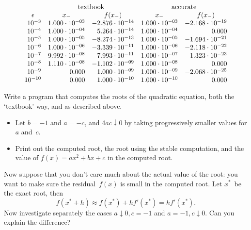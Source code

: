\begin{equation}
  \begin{array}{rrrrr}
    &\multicolumn{2}{c}{\mathrm{textbook}}&\multicolumn{2}{c}{\mathrm{accurate}}\\
    \multicolumn{1}{c}{\epsilon} &\multicolumn{1}{c}{x_-} &\multicolumn{1}{c}{f(x_-)} &\multicolumn{1}{c}{x_-} &\multicolumn{1}{c}{f(x_-)}\\
    10^{-3}& 1.000\cdot 10^{-03}& -2.876\cdot 10^{-14}&  1.000\cdot 10^{-03}&  -2.168\cdot 10^{-19}\\
    10^{-4}& 1.000\cdot 10^{-04}&  5.264\cdot 10^{-14}&  1.000\cdot 10^{-04}&   0.000\\
    10^{-5}& 1.000\cdot 10^{-05}& -8.274\cdot 10^{-13}&  1.000\cdot 10^{-05}&  -1.694\cdot 10^{-21}\\
    10^{-6}& 1.000\cdot 10^{-06}& -3.339\cdot 10^{-11}&  1.000\cdot 10^{-06}&  -2.118\cdot 10^{-22}\\
    10^{-7}& 9.992\cdot 10^{-08}&  7.993\cdot 10^{-11}&  1.000\cdot 10^{-07}&   1.323\cdot 10^{-23}\\
    10^{-8}&  1.110\cdot 10^{-08}& -1.102\cdot 10^{-09}&  1.000\cdot 10^{-08}&   0.000\\
    10^{-9}&  0.000&  1.000\cdot 10^{-09}&  1.000\cdot 10^{-09}&  -2.068\cdot 10^{-25}\\
    10^{-10}& 0.000&  1.000\cdot 10^{-10}&  1.000\cdot 10^{-10}&   0.000\\
  \end{array}
\end{equation}

\begin{exercise}
  Write a program that computes the roots of the quadratic equation, both
  the `textbook' way, and as described above. 
  \begin{itemize}
  \item Let $b=-1$ and $a=-c$, and $4ac\downarrow 0$ by taking progressively smaller
    values for $a$ and~$c$.
  \item Print out the computed root, the root using the stable computation,
    and the value of $f(x)=ax^2+bx+c$ in the computed root.
  \end{itemize}
  Now suppose that you don't care much about the actual value of the root:
  you want to make sure the residual~$f(x)$ is small in the computed root.
  Let $x^*$~be the exact root, then
  \begin{equation}
    f(x^*+h)\approx f(x^*)+hf'(x^*) = hf'(x^*).
  \end{equation}
  Now investigate separately the cases $a\downarrow 0,c=-1$ and $a=-1,c\downarrow0$.
  Can you explain the difference?
\end{exercise}

